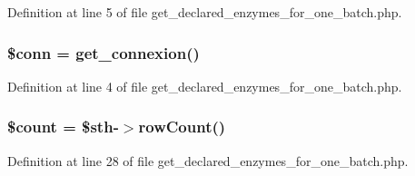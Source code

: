 Definition at line 5 of file get\-\_\-declared\-\_\-enzymes\-\_\-for\-\_\-one\-\_\-batch.\-php.

\hypertarget{get__declared__enzymes__for__one__batch_8php_aa8a5a87b9c1a6a0819b88447cbe41877}{
\subsubsection[{\$conn}]{\setlength{\rightskip}{0pt plus 5cm}\$conn = {\bf get\-\_\-connexion}()}}\label{get__declared__enzymes__for__one__batch_8php_aa8a5a87b9c1a6a0819b88447cbe41877}


Definition at line 4 of file get\-\_\-declared\-\_\-enzymes\-\_\-for\-\_\-one\-\_\-batch.\-php.

\hypertarget{get__declared__enzymes__for__one__batch_8php_af789423037bbc89dc7c850e761177570}{
\subsubsection[{\$count}]{\setlength{\rightskip}{0pt plus 5cm}\$count = \$sth-\/$>$row\-Count()}}\label{get__declared__enzymes__for__one__batch_8php_af789423037bbc89dc7c850e761177570}


Definition at line 28 of file get\-\_\-declared\-\_\-enzymes\-\_\-for\-\_\-one\-\_\-batch.\-php.

